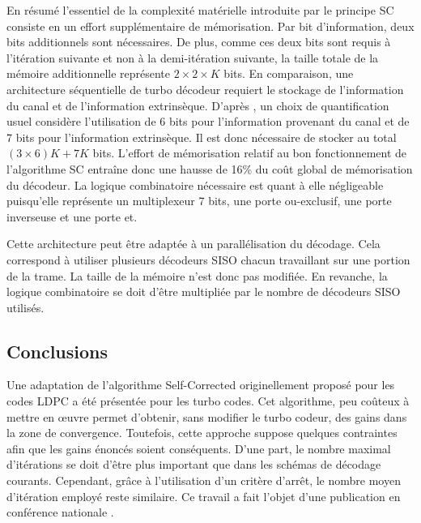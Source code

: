 En résumé l'essentiel de la complexité matérielle introduite par le principe SC consiste en un effort supplémentaire de mémorisation. Par bit 
d'information, deux bits additionnels sont nécessaires. De plus, comme ces deux bits sont 
requis à l'itération suivante et non à la demi-itération suivante, la taille totale de la mémoire additionnelle 
représente $2 \times 2 \times K$ bits. En comparaison, une architecture séquentielle de turbo décodeur requiert le stockage
de  l'information du canal et de l'information extrinsèque. D'après \cite{livre_declercq}, un choix de quantification 
usuel considère l'utilisation de 6 bits pour l'information provenant du canal et de 7 bits pour l'information extrinsèque.
Il est donc nécessaire de stocker au total $(3\times 6)K + 7 K$ bits. L'effort de mémorisation relatif au bon 
fonctionnement de l'algorithme SC entraîne donc une hausse de 16\% du coût global de mémorisation du décodeur.
La logique combinatoire nécessaire est quant à elle négligeable puisqu'elle
représente un multiplexeur 7 bits, une porte ou-exclusif, une porte inverseuse et une porte et.

Cette architecture peut être adaptée à un parallélisation du décodage. Cela correspond à utiliser plusieurs décodeurs SISO chacun 
travaillant sur une portion de la trame. La taille de la mémoire n'est donc pas modifiée. En revanche, la logique combinatoire
se doit d'être multipliée par le nombre de décodeurs SISO utilisés.


\subsection{Conclusions}
Une adaptation de l'algorithme Self-Corrected originellement proposé pour les codes LDPC a été présentée pour les turbo 
codes. Cet algorithme, peu coûteux à mettre en œuvre permet d'obtenir, sans modifier le turbo codeur, des gains dans la zone 
de convergence. Toutefois, cette approche suppose quelques contraintes afin que les gains énoncés soient
 conséquents. D'une part, le nombre maximal d'itérations se doit d'être plus important que dans les schémas de 
 décodage courants. Cependant, grâce à l'utilisation d'un critère d'arrêt, le nombre moyen d'itération employé reste 
 similaire. Ce travail a fait l'objet d'une publication en conférence nationale .

